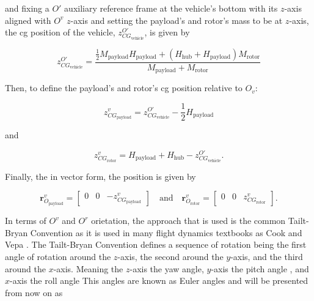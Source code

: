 and fixing a $O'$ auxiliary reference frame at the vehicle’s bottom with its $z$-axis aligned with $O^v$ $z$-axis and setting the payload's and rotor's mass to be at $z$-axis, the \gls{cg} position of the vehicle, \( z^{O'}_{CG_{\text{vehicle}}} \), is given by

\begin{equation}
    z^{O'}_{CG_{\text{vehicle}}} = \frac{\frac{1}{2} M_{\text{payload}} H_{\text{payload}} + \left(H_{\text{hub}} + H_{\text{payload}}\right) M_{\text{rotor}}}{M_{\text{payload}} + M_{\text{rotor}}}
\end{equation}

Then, to define the payload's and rotor's \gls{cg} position relative to \( O_v \):

\begin{equation}
    z^{v}_{CG_{\text{payload}}} = z^{O'}_{CG_{\text{vehicle}}} - \frac{1}{2} H_{\text{payload}}
\end{equation}

and

\begin{equation}
    z^{v}_{CG_{\text{rotor}}} = H_{\text{payload}} + H_{\text{hub}} - z^{O'}_{CG_{\text{vehicle}}}.
\end{equation}

Finally, the in vector form, the position is given by

\begin{equation}
    \mathbf{r}_{O_{\text{payload}}}^v =  \begin{bmatrix} 0 & 0 & -z^{v}_{CG_{\text{payload}}} \end{bmatrix} \quad \text{and} \quad \mathbf{r}_{O_{\text{rotor}}}^v =  \begin{bmatrix} 0 & 0 & z^{v}_{CG_{\text{rotor}}} \end{bmatrix}.
\end{equation}


In terms of $O^v$ and $O^r$ orietation, the approach that is used is the common Tailt-Bryan
Convention \cite{soler_fundamentals_2014} as it is used in many flight dynamics textbooks as Cook \cite{cook_flight_2007} and Vepa \cite{vepa_flight_2023}. The Tailt-Bryan Convention defines a sequence of rotation being the first angle of rotation around the $z$-axis, the second around the  $y$-axis, and the third around the  $x$-axis. Meaning the $z$-axis the yaw angle,  $y$-axis the pitch angle , and $x$-axis the roll angle This angles are known as Euler angles and will be presented from now on as

